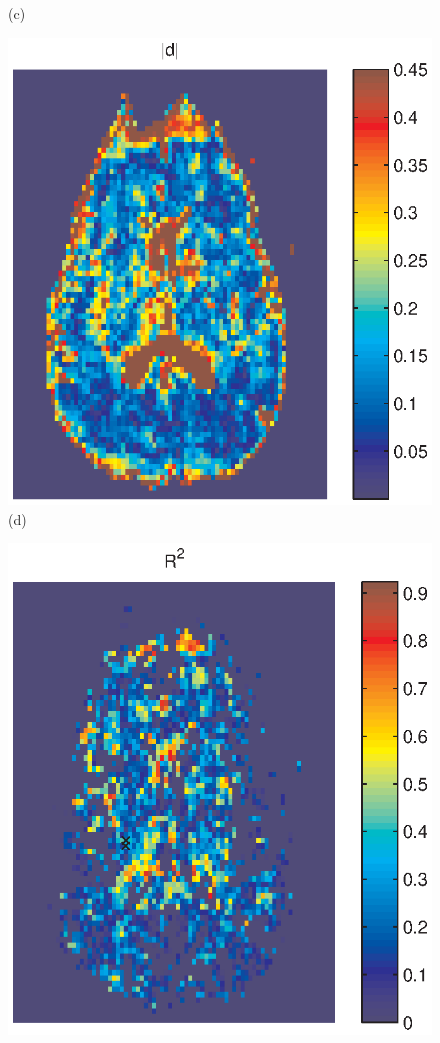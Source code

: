 \documentclass[authoryear,preprint,12pt]{elsarticle}
\begin{document}
\begin{figure}[p]
\begin{center}
\begin{minipage}[]{.30\textwidth}
       (c)
      \end{minipage}
      \begin{minipage}[]{.30\textwidth}
      \centering
      \includegraphics[width=\textwidth]{absdgg.eps}
       (d)
      \end{minipage}
      \begin{minipage}[]{.30\textwidth}
      \centering
      \includegraphics[width=\textwidth]{rsq255.eps}

\end{minipage}
\end{center}
\end{figure}
\end{document}
